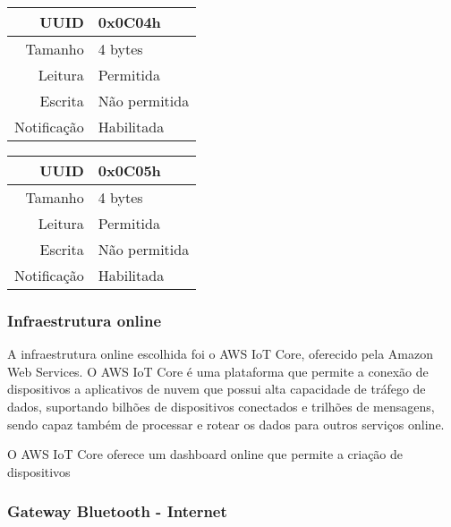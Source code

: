 \begin{tcolorbox}[arc=3mm,fontupper=\small,fonttitle=\bfseries,
subtitle style={boxrule=0.4pt, colback=white},colframe=green!25!black,
halign=center,bottom=0mm,
title=Luminosity Sensor Service]
\begin{tcbitemize}[raster columns=2,raster equal height,fontupper=\footnotesize,
	colbacktitle=yellow!100!red!100!black, coltitle=black,
	fonttitle=\footnotesize\bfseries,size=small, halign=center]
		\tcbitem [squeezed title={Pressure Data Characteristic}]
		\begin{tabular}{ r | l }
		UUID & 0x0C04h \\ \hline
		Tamanho & 4 bytes \\ \hline
		Leitura & Permitida \\ \hline
		Escrita & Não permitida \\ \hline
		Notificação & Habilitada 
		\end{tabular}
		
		\tcbitem [squeezed title={Temperature Data Characteristic}]
		\begin{tabular}{ r | l }
		UUID & 0x0C05h \\ \hline
		Tamanho & 4 bytes \\ \hline
		Leitura & Permitida \\ \hline
		Escrita & Não permitida \\ \hline
		Notificação & Habilitada 
		\end{tabular}		
	\end{tcbitemize}
	\tcblower
	\label{fig:resumo_lss}
\end{tcolorbox}


\subsubsection{Infraestrutura online}

A infraestrutura online escolhida foi o AWS IoT Core, oferecido pela Amazon Web
Services. O AWS IoT Core é uma plataforma que permite a conexão de dispositivos
a aplicativos de nuvem que possui alta capacidade de tráfego de dados,
suportando bilhões de dispositivos conectados e trilhões de mensagens, sendo
capaz também de processar e rotear os dados para outros serviços online.
\cite{AWS_IoTCore}


O AWS IoT Core oferece um dashboard online que permite a criação de dispositivos 




\subsubsection{Gateway Bluetooth - Internet}

